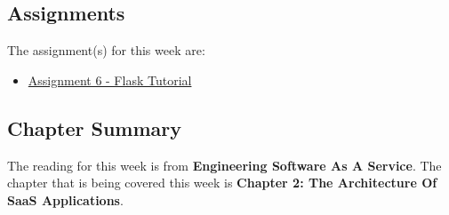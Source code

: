 \subsection{Assignments}

The assignment(s) for this week are:

\begin{itemize}
    \item \href{https://github.com/QuantumCompiler/CU/tree/main/CSPB%203308%20-%20Software%20Development%20Methods%20And%20Tools/Assignments/Assignment%206%20-%20Flask%20Tutorial}{Assignment 6 - Flask Tutorial}
\end{itemize}

\newpage

\subsection{Chapter Summary}

The reading for this week is from \textbf{Engineering Software As A Service}. The chapter that is being covered this week is \textbf{Chapter 2: The Architecture Of SaaS Applications}.

